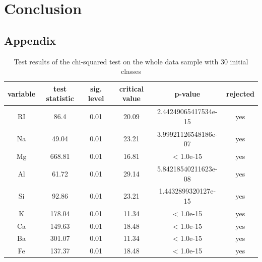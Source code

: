 \documentclass[a4paper, 12pt, titlepage, headsepline, listof = totoc, bibliography = totoc, numbers = noenddot]{scrartcl}
\begin{document}
\newpage
\section{Conclusion}\label{sec:conclusion}








\newpage

\begin{appendix}



\section{Appendix}

\begin{table}[h!]
\centering
\begin{tabular}{|cccccc|} \hline variable & test statistic & sig. level & critical value & p-value & rejected\\ \hline RI & 86.4 & 0.01 & 20.09 & 2.44249065417534e-15 & yes\\ 
Na & 49.04 & 0.01 & 23.21 & 3.99921126548186e-07 & yes\\ 
Mg & 668.81 & 0.01 & 16.81 & < 1.0e-15 & yes\\ 
Al & 61.72 & 0.01 & 29.14 & 5.84218540211623e-08 & yes\\ 
Si & 92.86 & 0.01 & 23.21 & 1.4432899320127e-15 & yes\\ 
K & 178.04 & 0.01 & 11.34 & < 1.0e-15 & yes\\ 
Ca & 149.63 & 0.01 & 18.48 & < 1.0e-15 & yes\\ 
Ba & 301.07 & 0.01 & 11.34 & < 1.0e-15 & yes\\ 
Fe & 137.37 & 0.01 & 18.48 & < 1.0e-15 & yes\\ \hline \end{tabular}\caption{Test results of the chi-squared test on the whole data sample with 30 initial classes}
\label{tab:chi-full-30}
\end{table}


\end{appendix}
\end{document}
